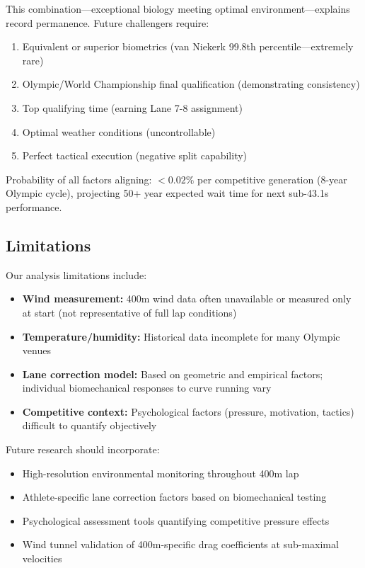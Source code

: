 \documentclass[12pt]{article}
\begin{document}
This combination—exceptional biology meeting optimal environment—explains record permanence. Future challengers require:
\begin{enumerate}
    \item Equivalent or superior biometrics (van Niekerk 99.8th percentile—extremely rare)
    \item Olympic/World Championship final qualification (demonstrating consistency)
    \item Top qualifying time (earning Lane 7-8 assignment)
    \item Optimal weather conditions (uncontrollable)
    \item Perfect tactical execution (negative split capability)
\end{enumerate}

Probability of all factors aligning: $<0.02\%$ per competitive generation (8-year Olympic cycle), projecting 50+ year expected wait time for next sub-43.1s performance.

\subsection{Limitations}

Our analysis limitations include:
\begin{itemize}
    \item \textbf{Wind measurement:} 400m wind data often unavailable or measured only at start (not representative of full lap conditions)
    \item \textbf{Temperature/humidity:} Historical data incomplete for many Olympic venues
    \item \textbf{Lane correction model:} Based on geometric and empirical factors; individual biomechanical responses to curve running vary
    \item \textbf{Competitive context:} Psychological factors (pressure, motivation, tactics) difficult to quantify objectively
\end{itemize}

Future research should incorporate:
\begin{itemize}
    \item High-resolution environmental monitoring throughout 400m lap
    \item Athlete-specific lane correction factors based on biomechanical testing
    \item Psychological assessment tools quantifying competitive pressure effects
    \item Wind tunnel validation of 400m-specific drag coefficients at sub-maximal velocities
\end{itemize}
\end{document}
